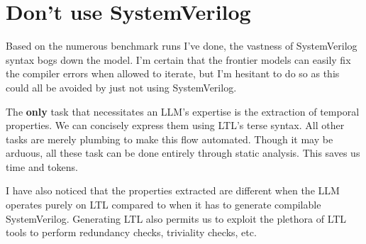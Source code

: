\documentclass[letterpaper, 12pt]{article}
\begin{document}
\section{Don't use SystemVerilog}
Based on the numerous benchmark runs I've done, the vastness of
SystemVerilog syntax bogs down the model. I'm certain that the frontier
models can easily fix the compiler errors when allowed to iterate,
but I'm hesitant
to do so as this could all be avoided by just not using SystemVerilog.

The \textbf{only} task that necessitates an LLM's expertise is the extraction
of temporal properties. We can concisely express them using LTL's terse syntax.
All other tasks are merely plumbing to make this flow automated.
Though it may be
arduous, all these task can be done entirely through static analysis.
This saves us time and tokens.

I have also noticed that the properties extracted are different when the LLM
operates purely on LTL compared to when it has to generate compilable
SystemVerilog. Generating LTL also permits us to exploit the plethora of
LTL tools to perform redundancy checks, triviality checks, etc.

\printbibliography
\end{document}
